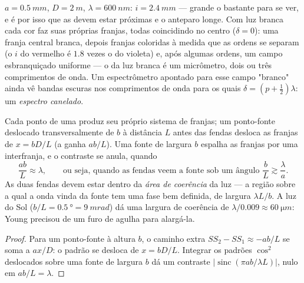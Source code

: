 \begin{example}\label{ex:b2:two-wave-interference:numbers}
$a = \qty{0.5}{mm}$, $D = \qty{2}{m}$, $\lambda = \qty{600}{nm}$: $i = \qty{2.4}{mm}$ --- grande
o bastante para se ver, e é por isso que as  devem estar próximas e o anteparo
longe. Com luz branca cada cor faz suas próprias franjas, todas
coincidindo no centro ($\delta = 0$): uma franja central branca, depois
franjas coloridas à medida que as ordens se separam (o $i$ do vermelho é $1.8$ vezes o
do violeta) e, após algumas ordens, um campo esbranquiçado uniforme --- o
 da luz branca é um micrômetro, dois ou três
comprimentos de onda. Um espectrômetro apontado para esse campo "branco" ainda vê
bandas escuras nos comprimentos de onda para os quais $\delta = (p + \tfrac12)\lambda$: um
\emph{espectro canelado}.
\end{example}

\begin{proposition}\label{prop:b2:two-wave-interference:spatial}
Cada ponto de uma  produz seu próprio sistema de franjas; um
ponto-fonte deslocado transversalmente de $b$ à distância $L$ antes
das fendas desloca as franjas de $x = bD/L$ (a  ganha
$ab/L$). Uma fonte de largura $b$ espalha as franjas por uma interfranja,
e o contraste se anula, quando
\[
\frac{ab}L \approx \lambda , \qquad\text{ou seja, quando as fendas veem a fonte sob um ângulo } \frac bL \gtrsim \frac\lambda a .
\]
As duas fendas devem estar dentro da \emph{área de coerência} da luz ---
a região sobre a qual a onda vinda da fonte tem uma fase bem
definida, de largura $\lambda L/b$. A luz do Sol ($b/L = \qty{0.5}{\degree} = \qty{9}{mrad}$)
dá uma largura de coerência de $\lambda/0.009 \approx \qty{60}{\micro m}$: Young precisou de um
furo de agulha para alargá-la.
\end{proposition}

\begin{proof}
Para um ponto-fonte à altura $b$, o caminho extra $SS_2 - SS_1 \approx -ab/L$
se soma a $ax/D$: o padrão se desloca de $x = bD/L$. Integrar os
padrões $\cos^2$ deslocados sobre uma fonte de largura $b$ dá um contraste
$|\operatorname{sinc}(\pi ab/\lambda L)|$, nulo em $ab/L = \lambda$.
\end{proof}

